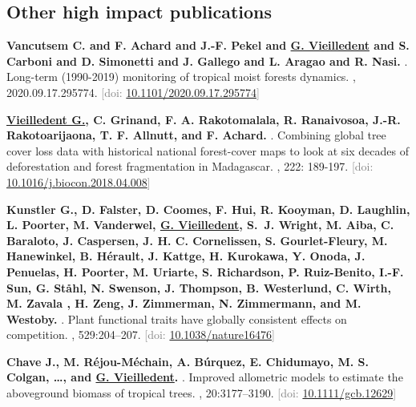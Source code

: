 \documentclass[10pt,a4paper,sans]{moderncv}
\newcounter{enumiv_gv}
\begin{document}
\vspace{0.3cm}
\subsection{Other high impact publications}

\begin{thebibliography}{5}

\setcounter{enumiv}{4}
\textbf{Vancutsem C. and F. Achard and J.-F. Pekel and \underline{G. Vieilledent} and S. Carboni and D. Simonetti and J. Gallego and L. Aragao and R. Nasi.}
.
\newblock Long-term (1990-2019) monitoring of tropical moist forests dynamics. 
, 2020.09.17.295774.
\newblock \textcolor{gray}{[doi: \href{https://doi.org/10.1101/2020.09.17.295774}{10.1101/2020.09.17.295774}]}

\setcounter{enumiv}{3}
\textbf{\underline{Vieilledent G.}, C. Grinand, F. A. Rakotomalala, R. Ranaivosoa, J.-R. Rakotoarijaona, T. F. Allnutt, and F. Achard.}
.
\newblock Combining global tree cover loss data with historical national forest-cover maps to look at six decades of deforestation and forest fragmentation in Madagascar. 
, 222: 189-197.
\newblock \textcolor{gray}{[doi: \href{https://doi.org/10.1016/j.biocon.2018.04.008}{10.1016/j.biocon.2018.04.008}]}

\setcounter{enumiv}{2}
\textbf{Kunstler G., D. Falster, D. Coomes, F. Hui, R. Kooyman, D. Laughlin, L. Poorter, M. Vanderwel, \underline{G. Vieilledent}, S.~J. Wright, M. Aiba, C. Baraloto, J. Caspersen, J. H. C. Cornelissen, S. Gourlet-Fleury, M. Hanewinkel, B. Hérault, J. Kattge, H. Kurokawa, Y. Onoda, J. Penuelas, H. Poorter, M. Uriarte, S. Richardson, P. Ruiz-Benito, I.-F. Sun, G. Ståhl, N. Swenson, J. Thompson, B. Westerlund, C. Wirth, M. Zavala , H. Zeng, J. Zimmerman, N. Zimmermann, and M. Westoby.} 
.
\newblock Plant functional traits have globally consistent effects on competition.
, 529:204--207.
\newblock \textcolor{gray}{[doi: \href{https://doi.org/10.1038/nature16476}{10.1038/nature16476}]}

\setcounter{enumiv}{1}
\textbf{Chave J., M. Réjou-Méchain, A. Búrquez, E. Chidumayo, M. S. Colgan, \ldots, and \underline{G. Vieilledent}.} 
.
\newblock Improved allometric models to estimate the aboveground biomass of tropical trees. 
, 20:3177--3190.
\newblock \textcolor{gray}{[doi: \href{https://doi.org/10.1111/gcb.12629}{10.1111/gcb.12629}]}


\end{thebibliography}
\end{document}
